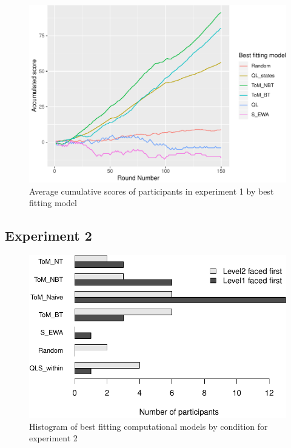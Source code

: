 \documentclass[man,floatsintext]{apa6}
\begin{document}
\begin{figure}

{\centering \includegraphics{draft_report_v1_files/figure-latex/exp1-cumScores-1} 

}

\caption{Average cumulative scores of participants in experiment 1 by best fitting model}\label{fig:exp1-cumScores}
\end{figure}

\hypertarget{experiment-2}{%
\subsection{Experiment 2}\label{experiment-2}}

\begin{figure}

{\centering \includegraphics{draft_report_v1_files/figure-latex/exp2-comp-models-1} 

}

\caption{Histogram of best fitting computational models by condition for experiment 2}\label{fig:exp2-comp-models}
\end{figure}
\end{document}
